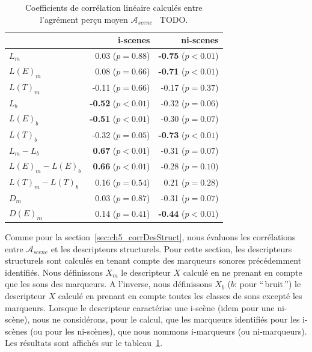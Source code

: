\begin{table}[t]
\centering
\begin{tabular}{l r r} 
                  &   i-scenes                  & ni-scenes \\
\hline
$L_m$              & 0.03  ($p=0.88$)           & \textbf{-0.75} ($p<0.01$) \\
$L(E)_m$           & 0.08  ($p=0.66$)           & \textbf{-0.71} ($p<0.01$) \\
$L(T)_m$           & -0.11 ($p=0.66$)           & -0.17 ($p=0.37$) \\
$L_b$              & \textbf{-0.52} ($p<0.01$)  & -0.32 ($p=0.06$) \\
$L(E)_b$           & \textbf{-0.51} ($p<0.01$)  & -0.30 ($p=0.07$) \\
$L(T)_b$           & -0.32 ($p=0.05$)           & \textbf{-0.73} ($p<0.01$) \\
$L_m-L_b$          & \textbf{0.67} ($p<0.01$)   & -0.31 ($p=0.07$) \\
$L(E)_m-L(E)_b$    & \textbf{0.66} ($p<0.01$)   & -0.28 ($p=0.10$) \\
$L(T)_m-L(T)_b$    & 0.16 ($p=0.54$)            & 0.21 ($p=0.28$) \\
$D_m$              & 0.03 ($p=0.87$)            & -0.31 ($p=0.07$) \\
$D(E)_m$           & 0.14 ($p=0.41$)            & \textbf{-0.44} ($p<0.01$) \\
\hline
\end{tabular}
\vspace{0.5mm}
\caption{Coefficients de corrélation linéaire calculés entre l'agrément perçu moyen $\mathcal{A}_{scene}$ \vs~TODO.}
\label{tab:corrMarkers}
\end{table}

Comme pour la  section~\ref{sec:ch5_corrDesStruct}, nous évaluons les corrélations entre $\mathcal{A}_{scene}$ et les descripteurs structurels. Pour cette section, les descripteurs structurels sont calculés en tenant compte des marqueurs sonores précédemment identifiés. Nous définissons $X_m$ le descripteur $X$ calculé en ne prenant en compte que les sons des marqueurs. A l'inverse, nous définissons $X_b$ ($b$: pour ``\,bruit\,'') le descripteur $X$ calculé en prenant en compte toutes les classes de sons excepté les marqueurs. Lorsque le descripteur caractérise une i-scène (idem pour une ni-scène), nous ne considérons, pour le calcul, que les marqueurs identifiés pour les i-scènes (ou pour les ni-scènes), que nous nommons i-marqueurs (ou ni-marqueurs). Les résultats sont affichés sur le tableau~\ref{tab:corrMarkers}.

